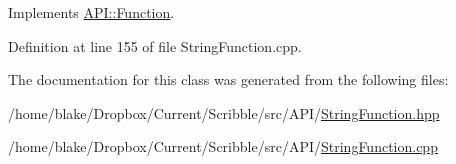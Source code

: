 Implements \hyperlink{class_a_p_i_1_1_function_ae56761ad4c849c05e12cb4cd02583c77}{A\-P\-I\-::\-Function}.



Definition at line 155 of file String\-Function.\-cpp.



The documentation for this class was generated from the following files\-:\begin{DoxyCompactItemize}
\item 
/home/blake/\-Dropbox/\-Current/\-Scribble/src/\-A\-P\-I/\hyperlink{_string_function_8hpp}{String\-Function.\-hpp}\item 
/home/blake/\-Dropbox/\-Current/\-Scribble/src/\-A\-P\-I/\hyperlink{_string_function_8cpp}{String\-Function.\-cpp}\end{DoxyCompactItemize}
